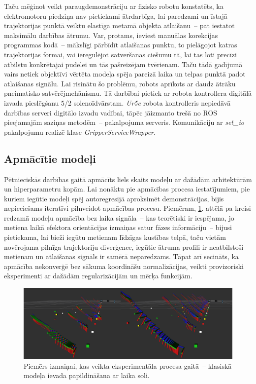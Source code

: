 \documentclass[12pt, a4paper]{article}
\numberwithin{equation}{section} %
\begin{document}
Taču mēģinot veikt paraugdemonstrāciju ar fizisko robotu konstatēts, ka elektromotoru piedziņa nav pietiekami ātrdarbīga, lai paredzami un īstajā trajektorijas punktā veiktu elastīga metamā objekta atlaišanu~-- pat iestatot maksimālu darbības ātrumu. Var, protams, ieviest manuālas korekcijas programmas kodā~-- mākslīgi pārbīdīt atlaišanas punktu, to pielāgojot katras trajektorijas formai, vai ieregulējot satveršanas ciešumu tā, lai tas ļoti precīzi atbilstu konkrētajai pudelei un tās pašreizējam tvērienam. Taču tādā gadījumā vairs netiek objektīvi vērtēta modeļa spēja pareizā laika un telpas punktā padot atlaišanas signālu. Lai risinātu šo problēmu, robots aprīkots ar daudz ātrāku pneimatisko satvērējmehānismu. Tā darbībai pietiek ar robota kontrollera digitālā izvada pieslēgšanu 5/2 solenoīdvārstam. \textit{Ur5e} robota kontrolleris nepiedāvā darbības serveri digitālo izvadu vadībai, tāpēc jāizmanto trešā no ROS pieejamajām saziņas metodēm~-- pakalpojuma serveris. Komunikāciju ar \textit{set\_io} pakalpojumu realizē klase \textit{GripperServiceWrapper}.

\subsection{Apmācītie modeļi}

Pētnieciskās darbības gaitā apmācīts liels skaits modeļu ar dažādām arhitektūrām un hiperparametru kopām. Lai nonāktu pie apmācības procesa iestatījumiem, pie kuriem iegūtie modeļi spēj autoregresijā aproksimēt demonstrācijas, bijis nepieciešams iteratīvi pilnveidot apmācības procesu. Piemēram, \ref{empirical_change}. attēlā pa kreisi redzamā modeļu apmācība bez laika signāla~-- kas teorētiski ir iespējama, jo metiena laikā efektora orientācijas izmaiņas satur fāzes informāciju~-- bijusi pietiekama, lai bieži iegūtu metienam līdzīgas kustības telpā, taču vietām novērojama pilnīga trajektoriju diverģence, iegūtie ātruma profili ir neatbilstoši metienam un atlaišanas signāls ir samērā neparedzams. Tāpat arī secināts, ka apmācība nekonverģē bez sākuma koordināšu normalizācijas, veikti provizoriski eksperimenti ar dažādām regularizācijām un mērķa funkcijām.

\begin{figure}[t!]
    \centering
    \includegraphics[width=16cm,page=1]{../img/traj_no_timesignal.png}
    \caption{Piemērs izmaiņai, kas veikta eksperimentāla procesa gaitā~-- klasiskā modeļa ievada papildināšana ar laika soli.}
    \label{empirical_change}
\end{figure}
\end{document}
